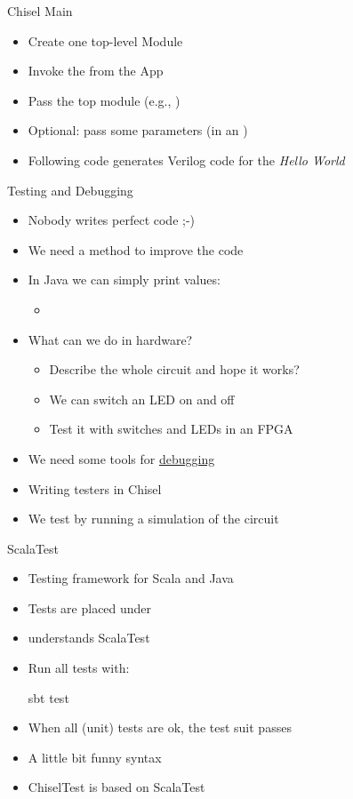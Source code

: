\begin{frame}[fragile]{Chisel Main}

\begin{itemize}
\item Create one top-level Module
\item Invoke the  from the App
\item Pass the top module (e.g., )
\item Optional: pass some parameters (in an )
\item Following code generates Verilog code for the \emph{Hello World}
\end{itemize}
\end{frame}

\begin{frame}[fragile]{Testing and Debugging}
\begin{itemize}
\item Nobody writes perfect code ;-)
\item We need a method to improve the code
\item In Java we can simply print values:
\begin{itemize}
\item {}
\end{itemize}
\item What can we do in hardware?
\begin{itemize}
\item Describe the whole circuit and hope it works?
\item We can switch an LED on and off
\item Test it with switches and LEDs in an FPGA
\end{itemize}
\item We need some tools for \href{https://en.wikipedia.org/wiki/Debugging#/media/File:H96566k.jpg}{debugging}
\item Writing testers in Chisel
\item We test by running a simulation of the circuit
\end{itemize}
\end{frame}

\begin{frame}[fragile]{ScalaTest}
\begin{itemize}
\item Testing framework for Scala and Java
\item Tests are placed under 
\item {} understands ScalaTest
\item Run all tests with:
\begin{chisel}
sbt test
\end{chisel}
\item When all (unit) tests are ok, the test suit passes
\item A little bit funny syntax
\item ChiselTest is based on ScalaTest
\end{itemize}
\end{frame}

